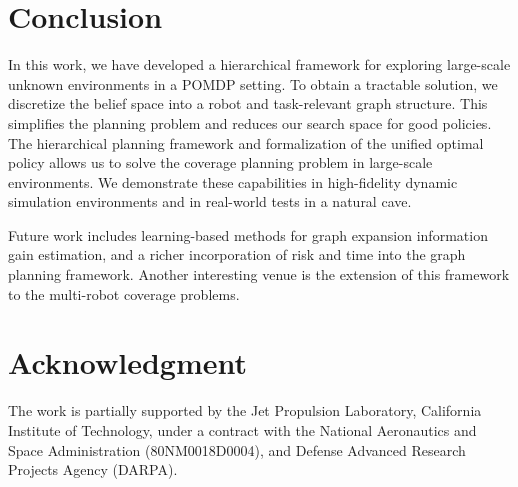 \documentclass[letterpaper]{article} %
\begin{document}
\section{Conclusion}\label{sec:conclusion}

In this work, we have developed a hierarchical framework for exploring large-scale unknown environments in a POMDP setting. 
To obtain a tractable solution, we discretize the belief space into a robot and task-relevant graph structure. This simplifies the planning problem and reduces our search space for good policies.
The hierarchical planning framework and formalization of the unified optimal policy allows us to solve the coverage planning problem in large-scale environments.
We demonstrate these capabilities in high-fidelity dynamic simulation environments and in real-world tests in a natural cave.  

Future work includes learning-based methods for graph expansion information gain estimation, and a richer incorporation of risk and time into the graph planning framework.
Another interesting venue is the extension of this framework to the multi-robot coverage problems.


\section*{Acknowledgment}
The work is partially supported by the Jet Propulsion Laboratory, California Institute of Technology, under a contract with the National Aeronautics and Space Administration (80NM0018D0004), and Defense Advanced Research Projects Agency (DARPA).




\end{document}
